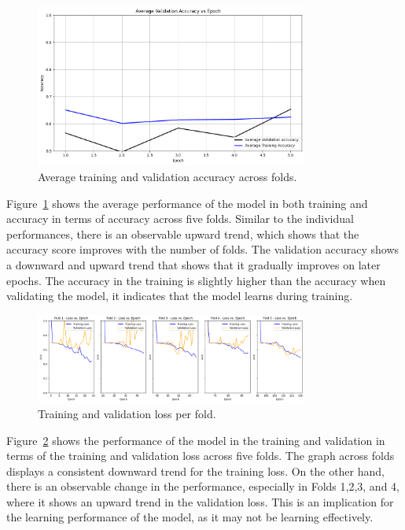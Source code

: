 \begin{figure}[!htbp]
	\centering
	\includegraphics[width=0.8\textwidth]{figures/avg_acc.png}
	\caption{Average training and validation accuracy across folds.}
	\label{fig:atvaaf}
\end{figure}

Figure~\ref{fig:atvaaf} shows the average performance of the model in both training and accuracy in terms of accuracy across five folds. Similar to the individual performances, there is an observable upward trend, which shows that the accuracy score improves with the number of folds. The validation accuracy shows a downward and upward trend that shows that it gradually improves on later epochs. The accuracy in the training is slightly higher than the accuracy when validating the model, it indicates that the model learns during training.

\begin{figure}[!htbp]
	\centering
	\includegraphics[width=0.8\textwidth]{figures/loss_epoch.png}
	\caption{Training and validation loss per fold.}
	\label{fig:tvlpf}
\end{figure}

Figure~\ref{fig:tvlpf} shows the performance of the model in the training and validation in terms of the training and validation loss across five folds. The graph across folds displays a consistent downward trend for the training loss. On the other hand, there is an observable change in the performance, especially in Folds 1,2,3, and 4, where it shows an upward trend in the validation loss. This is an implication for the learning performance of the model, as it may not be learning effectively. 

